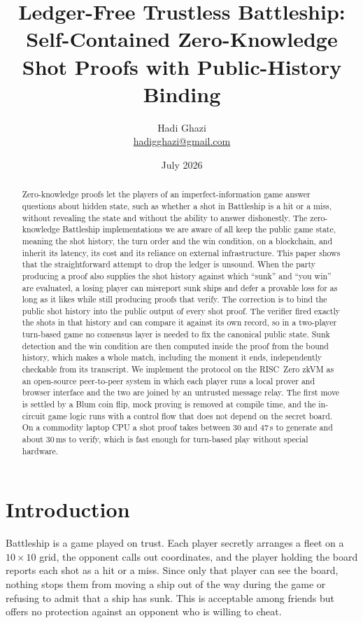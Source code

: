 \documentclass[11pt,a4paper]{article}
\title{\textbf{Ledger-Free Trustless Battleship:}\\[3pt]
\large Self-Contained Zero-Knowledge Shot Proofs with Public-History Binding}
\author{Hadi Ghazi\\ \small \href{mailto:hadigghazi@gmail.com}{hadigghazi@gmail.com}}
\date{July 2026}
\begin{document}
\maketitle

\begin{abstract}
\noindent
Zero-knowledge proofs let the players of an imperfect-information game answer
questions about hidden state, such as whether a shot in Battleship is a hit or
a miss, without revealing the state and without the ability to answer
dishonestly. The zero-knowledge Battleship implementations we are aware of all
keep the public game state, meaning the shot history, the turn order and the
win condition, on a blockchain, and inherit its latency, its cost and its
reliance on external infrastructure. This paper shows that the straightforward
attempt to drop the ledger is unsound. When the party producing a proof also
supplies the shot history against which ``sunk'' and ``you win'' are evaluated,
a losing player can misreport sunk ships and defer a provable loss for as long
as it likes while still producing proofs that verify. The correction is to bind
the public shot history into the public output of every shot proof. The
verifier fired exactly the shots in that history and can compare it against its
own record, so in a two-player turn-based game no consensus layer is needed to
fix the canonical public state. Sunk detection and the win condition are then
computed inside the proof from the bound history, which makes a whole match,
including the moment it ends, independently checkable from its transcript. We
implement the protocol on the RISC~Zero zkVM as an open-source peer-to-peer
system in which each player runs a local prover and browser interface and the
two are joined by an untrusted message relay. The first move is settled by a
Blum coin flip, mock proving is removed at compile time, and the in-circuit
game logic runs with a control flow that does not depend on the secret board.
On a commodity laptop CPU a shot proof takes between 30 and 47\,s to generate
and about 30\,ms to verify, which is fast enough for turn-based play without
special hardware.
\end{abstract}

\section{Introduction}
\label{sec:intro}

Battleship is a game played on trust. Each player secretly arranges a fleet on
a $10\times10$ grid, the opponent calls out coordinates, and the player holding
the board reports each shot as a hit or a miss. Since only that player can see
the board, nothing stops them from moving a ship out of the way during the game
or refusing to admit that a ship has sunk. This is acceptable among friends but
offers no protection against an opponent who is willing to cheat.
\end{document}
